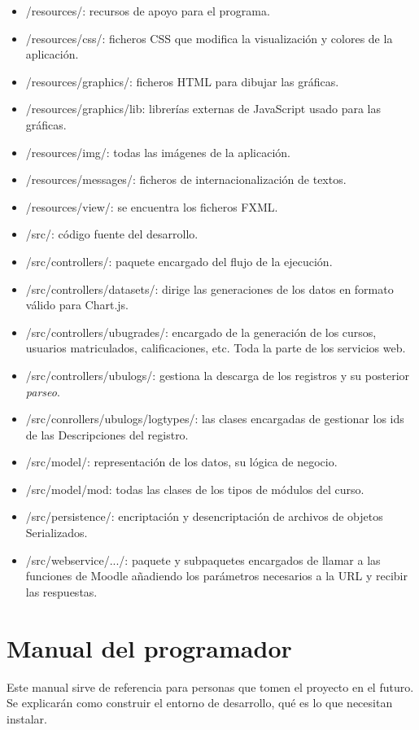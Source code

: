 \begin{itemize}
	\item /resources/: recursos de apoyo para el programa.
	\item /resources/css/: ficheros CSS que modifica la visualización y colores de la aplicación.
	\item /resources/graphics/: ficheros HTML para dibujar las gráficas.
	\item /resources/graphics/lib: librerías externas de JavaScript usado para las gráficas.
	\item /resources/img/: todas las imágenes de la aplicación.
	\item /resources/messages/: ficheros de internacionalización de textos.
	\item /resources/view/: se encuentra los ficheros FXML.
	\item /src/: código fuente del desarrollo.
	\item /src/controllers/: paquete encargado del flujo de la ejecución.
	\item /src/controllers/datasets/: dirige las generaciones de los datos en formato válido para Chart.js.
	\item /src/controllers/ubugrades/: encargado de la generación de los cursos, usuarios matriculados, calificaciones, etc. Toda la parte de los servicios web.
	\item /src/controllers/ubulogs/: gestiona la descarga de los registros y su posterior \textit{parseo}.
	\item /src/conrollers/ubulogs/logtypes/: las clases encargadas de gestionar los ids de las Descripciones del registro.
	\item /src/model/: representación de los datos, su lógica de negocio.
	\item /src/model/mod: todas las clases de los tipos de módulos del curso.
	\item /src/persistence/: encriptación y desencriptación de archivos de objetos Serializados.
	\item /src/webservice/.../: paquete y subpaquetes encargados de llamar a las funciones de Moodle añadiendo los parámetros necesarios a la URL y recibir las respuestas.
\end{itemize}

\section{Manual del programador} \label{sec:manual_programdor}

Este manual sirve de referencia para personas que tomen el proyecto en el futuro. Se explicarán como construir el entorno de desarrollo, qué es lo que necesitan instalar.

